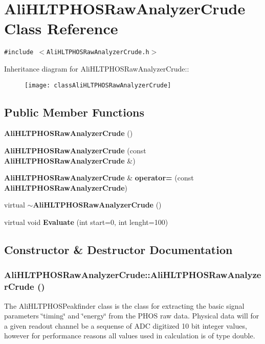 \section{Ali\-HLTPHOSRaw\-Analyzer\-Crude Class Reference}
\label{classAliHLTPHOSRawAnalyzerCrude}
{\tt \#include $<$Ali\-HLTPHOSRaw\-Analyzer\-Crude.h$>$}

Inheritance diagram for Ali\-HLTPHOSRaw\-Analyzer\-Crude::\begin{figure}[H]
\begin{center}
\leavevmode
\texttt{[image: classAliHLTPHOSRawAnalyzerCrude]}
\end{center}
\end{figure}
\subsection*{Public Member Functions}
\begin{CompactItemize}
\item 
{\bf Ali\-HLTPHOSRaw\-Analyzer\-Crude} ()
\item 
{\bf Ali\-HLTPHOSRaw\-Analyzer\-Crude} (const {\bf Ali\-HLTPHOSRaw\-Analyzer\-Crude} \&)
\item 
{\bf Ali\-HLTPHOSRaw\-Analyzer\-Crude} \& {\bf operator=} (const {\bf Ali\-HLTPHOSRaw\-Analyzer\-Crude})
\item 
virtual {\bf $\sim$Ali\-HLTPHOSRaw\-Analyzer\-Crude} ()
\item 
virtual void {\bf Evaluate} (int start=0, int lenght=100)
\end{CompactItemize}


\subsection{Constructor \& Destructor Documentation}
\subsubsection{\setlength{\rightskip}{0pt plus 5cm}Ali\-HLTPHOSRaw\-Analyzer\-Crude::Ali\-HLTPHOSRaw\-Analyzer\-Crude ()}\label{classAliHLTPHOSRawAnalyzerCrude_a0}


The Ali\-HLTPHOSPeakfinder class is the class for extracting the basic signal parameters \char`\"{}timing\char`\"{} and \char`\"{}energy\char`\"{} from the PHOS raw data. Physical data will for a given readout channel be a sequense of ADC digitized 10 bit integer values, however for performance reasons all values used in calculation is of type double. 
